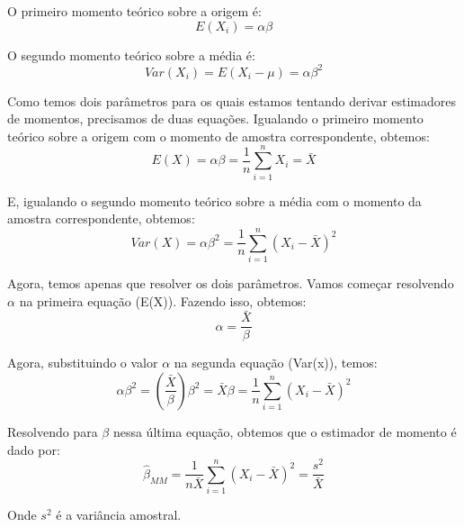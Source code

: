 O primeiro momento teórico sobre a origem é:
\begin{equation}
	E(X_i) = \alpha\beta
\end{equation}

O segundo momento teórico sobre a média é: 
\begin{equation}
	Var(X_i) = E(X_i - \mu) = \alpha\beta^2
\end{equation}

Como temos dois parâmetros para os quais estamos tentando derivar estimadores de momentos, precisamos de duas equações. Igualando o primeiro momento teórico sobre a origem com o momento de amostra correspondente, obtemos:
\begin{equation}
	E(X)=\alpha\beta=\dfrac{1}{n}\sum\limits_{i=1}^n X_i=\bar{X}
\end{equation}

E, igualando o segundo momento teórico sobre a média com o momento da amostra correspondente, obtemos:
\begin{equation}
	Var(X)=\alpha\beta^2=\dfrac{1}{n}\sum\limits_{i=1}^n (X_i-\bar{X})^2
\end{equation}

Agora, temos apenas que resolver os dois parâmetros. Vamos  começar resolvendo \begin{math} \alpha \end{math} na primeira equação (E(X)). Fazendo isso, obtemos:
\begin{equation}
	\alpha=\dfrac{\bar{X}}{\beta}
\end{equation}

Agora, substituindo o valor \begin{math} \alpha \end{math} na segunda equação (Var(x)), temos:
\begin{equation}
\alpha\beta^2=\left(\dfrac{\bar{X}}{\beta}\right)\beta^2=\bar{X}\beta=\dfrac{1}{n}\sum\limits_{i=1}^n (X_i-\bar{X})^2
\end{equation}

Resolvendo para \begin{math} \beta \end{math} nessa última equação, obtemos que o estimador de momento é dado por: 
\begin{equation}
\hat{\beta}_{MM}=\dfrac{1}{n\bar{X}}\sum\limits_{i=1}^n(X_i-\bar{X})^2 = \frac{s^2}{\bar{X}} 
\end{equation}

Onde $s^{2}$ é a variância amostral.

